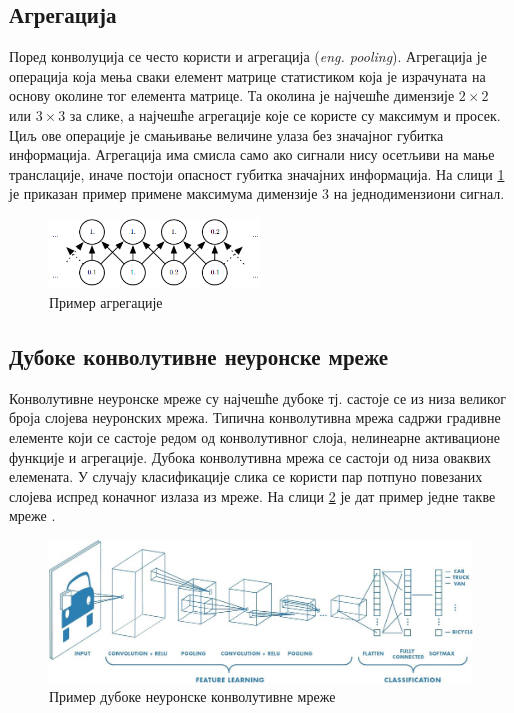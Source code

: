 \documentclass[11pt,oneside]{memoir}
\begin{document}
\subsection{Агрегација}

Поред конволуција се често користи и агрегација (\textit{eng. pooling}). Агрегација је операција која мења сваки елемент матрице
статистиком која је израчуната на основу околине тог елемента матрице. Та околина је најчешће димензије $2\times 2$ или $3\times 3$ за слике,
а најчешће агрегације које се користе су максимум и просек. Циљ ове операције је смањивање величине улаза без значајног губитка 
информација. Агрегација има смисла само ако сигнали нису осетљиви на мање транслације, иначе постоји опасност губитка значајних информација. 
На слици \ref{maxpool} је приказан пример примене максимума димензије $3$ на једнодимензиони сигнал.

\begin{figure}[H]
  \centering
  \includegraphics[width=0.5\textwidth]{images/maxpool.png}
  \caption{Пример агрегације\label{maxpool}}
\end{figure}

\subsection{Дубоке конволутивне неуронске мреже}

Конволутивне неуронске мреже су најчешће дубоке тј. састоје се из низа великог броја слојева неуронских мрежа. Типична конволутивна
мрежа садржи градивне елементе који се састоје редом од конволутивног слоја, нелинеарне активационе функције и агрегације. Дубока конволутивна
мрежа се састоји од низа оваквих елемената. У случају класификације слика се користи пар потпуно повезаних слојева испред коначног излаза из мреже.
На слици \ref{dcnn} је дат пример једне такве мреже \cite{deep_learning_goodfellow, ml_mladen}.

\begin{figure}[H]
  \centering
  \includegraphics[width=1.0\textwidth]{images/dcnn.jpeg}
  \caption{Пример дубоке неуронске конволутивне мреже\protect\footnotemark \label{dcnn}}
\end{figure}
\end{document}
